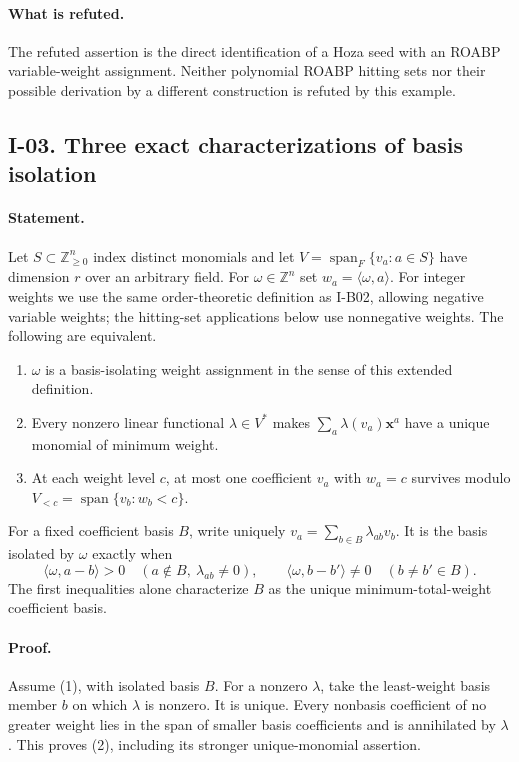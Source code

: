 \paragraph{What is refuted.}
The refuted assertion is the direct identification of a Hoza seed with
an ROABP variable-weight assignment.  Neither polynomial ROABP hitting
sets nor their possible derivation by a different construction is
refuted by this example.

\subsection{I-03. Three exact characterizations of basis isolation}
\label{I-03}

\paragraph{Statement.}
Let $S\subset\mathbb Z_{\geq0}^n$ index distinct monomials and let
$V=\operatorname{span}_F\{v_a:a\in S\}$ have dimension $r$ over an arbitrary field.
For $\omega\in\mathbb Z^n$ set $w_a=\langle\omega,a\rangle$.
For integer weights we use the same order-theoretic definition as
I-B02, allowing negative variable weights; the hitting-set
applications below use nonnegative weights.
The following are equivalent.
\begin{enumerate}
\item $\omega$ is a basis-isolating weight assignment in the sense of
this extended definition.
\item Every nonzero linear functional $\lambda\in V^*$ makes
$\sum_a\lambda(v_a)\mathbf x^a$ have a unique monomial of minimum weight.
\item At each weight level $c$, at most one coefficient $v_a$ with
$w_a=c$ survives modulo
$V_{<c}=\operatorname{span}\{v_b:w_b<c\}$.
\end{enumerate}
For a fixed coefficient basis $B$, write uniquely
$v_a=\sum_{b\in B}\lambda_{ab}v_b$.  It is the basis isolated by
$\omega$ exactly when
\[
 \langle\omega,a-b\rangle>0
 \quad(a\notin B,\ \lambda_{ab}\ne0),
 \qquad
 \langle\omega,b-b'\rangle\ne0\quad(b\ne b'\in B).
\tag{I.3}\label{eq:I-cone}
\]
The first inequalities alone characterize $B$ as the unique
minimum-total-weight coefficient basis.

\paragraph{Proof.}
Assume (1), with isolated basis $B$.  For a nonzero $\lambda$, take
the least-weight basis member $b$ on which $\lambda$ is nonzero.
It is unique.  Every nonbasis coefficient of no greater weight lies
in the span of smaller basis coefficients and is annihilated by
$\lambda$.  This proves (2), including its stronger unique-monomial
assertion.

